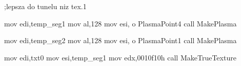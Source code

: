 ;lepsza do tunelu niz tex.1

	mov   edi,temp_seg1
	mov   al,128
	mov   esi, o PlasmaPoint4
	call  MakePlasma

	mov   edi,temp_seg2
	mov   al,128
	mov   esi, o PlasmaPoint1
	call  MakePlasma

	mov   edi,txt0
	mov   esi,temp_seg1
	mov   edx,0010f10h
	call  MakeTrueTexture

